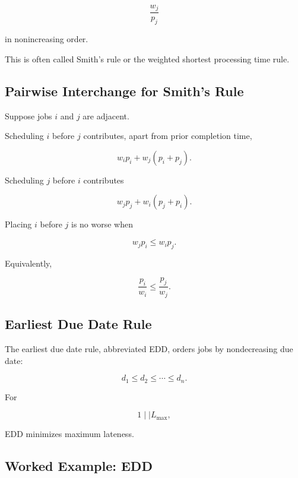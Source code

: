 \[
\boxed{
\frac{w_j}{p_j}
}
\]

in nonincreasing order.

This is often called Smith's rule or the weighted shortest processing time
rule.

\subsection{Pairwise Interchange for Smith's Rule}
\label{subsec:smith-rule-proof}

Suppose jobs \(i\) and \(j\) are adjacent.

Scheduling \(i\) before \(j\) contributes, apart from prior completion
time,

\[
w_i p_i
+
w_j(p_i+p_j).
\]

Scheduling \(j\) before \(i\) contributes

\[
w_j p_j
+
w_i(p_j+p_i).
\]

Placing \(i\) before \(j\) is no worse when

\[
w_jp_i
\leq
w_ip_j.
\]

Equivalently,

\[
\boxed{
\frac{p_i}{w_i}
\leq
\frac{p_j}{w_j}.
}
\]

\subsection{Earliest Due Date Rule}
\label{subsec:edd-rule}

The earliest due date rule, abbreviated EDD, orders jobs by nondecreasing
due date:

\[
\boxed{
d_1
\leq
d_2
\leq
\cdots
\leq
d_n.
}
\]

For

\[
\boxed{
1\mid\mid L_{\max},
}
\]

EDD minimizes maximum lateness.

\subsection{Worked Example: EDD}
\label{subsec:worked-edd}

